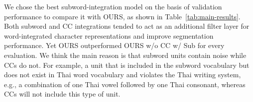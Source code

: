 We chose the best subword-integration model on the basis of validation performance to compare it with OURS, as shown in Table~\ref{tab:main-results}. 
%
Both subword and CC integrations tended to act as an additional filter layer for word-integrated character representations and improve segmentation performance.
%
Yet OURS outperformed OURS w/o CC w/ Sub for every evaluation.
%
We think the main reason is that subword units contain noise while CCs do not.
%
For example, a unit that is included in the subword vocabulary but does not exist in Thai word vocabulary and violates the Thai writing system, e.g., a combination of one Thai vowel followed by one Thai consonant, whereas CCs will not include this type of unit.
%

\begin{table}
\centering
{}
\caption{Results of our subword-integration model (OURS w/o CC w/ Sub) with various subword-vocabulary sizes from 800 to 12,800 tokens. The best result of three runs are reported. \underline{underline} indicates model that obtained best score in validation process.}
\label{tab:subword-results}
\end{table}

